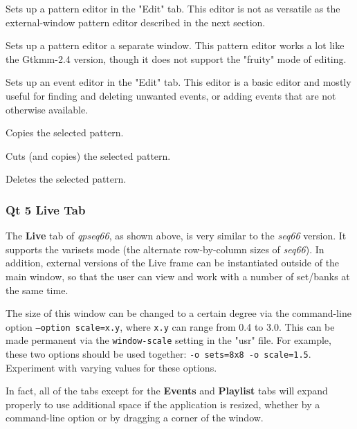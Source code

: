       Sets up a pattern editor in the "Edit" tab.  This editor is not as
      versatile as the external-window pattern editor described in the next
      section.

      Sets up a pattern editor a separate window.  This pattern editor works a
      lot like the Gtkmm-2.4 version, though it does not support the "fruity"
      mode of editing.

      Sets up an event editor in the "Edit" tab.  This editor is a basic editor
      and mostly useful for finding and deleting unwanted events, or adding
      events that are not otherwise available.

      Copies the selected pattern.

      Cuts (and copies) the selected pattern.

      Deletes the selected pattern.

\subsubsection{Qt 5 Live Tab}
\label{subsubsec:qt_portmidi_qt5_live_tab}

   The \textbf{Live} tab of \textsl{qpseq66}, as shown above, is very similar
   to the \textsl{seq66} version.  It supports the
   varisets mode (the alternate row-by-column sizes of \textsl{seq66}).
   In addition, external versions of the Live frame can be instantiated outside
   of the main window, so that the user can
   view and work with a number of set/banks at the same time.

   The size of this window can be changed to a certain degree via
   the command-line option \texttt{--option scale=x.y}, where \texttt{x.y} can
   range from 0.4 to 3.0.  This can be made permanent via the
   \texttt{window-scale} setting in the "usr" file.
   For example, these two options should be used together:
   \texttt{-o sets=8x8 -o scale=1.5}.  Experiment with varying values for these
   options.

   In fact, all of the tabs except for the \textbf{Events} and
   \textbf{Playlist}
   tabs will expand properly to
   use additional space if the application is resized, whether by a
   command-line option or by dragging a corner of the window.

